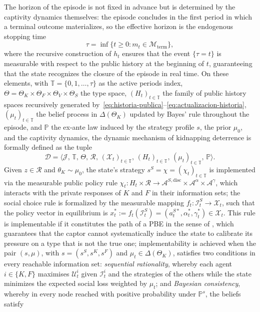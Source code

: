 \documentclass[ecta,nameyear,draft]{econsocart}
\theoremstyle{plain}
\theoremstyle{definition}
\newcommand{\Prob}{\mathbb{P}}
\newcommand{\ThetaK}{\Theta_K}
\newcommand{\1}{\mathbf{1}}
\begin{document}
The horizon of the episode is not fixed in advance but is determined by the captivity dynamics themselves: the episode concludes in the first period in which a terminal outcome materializes, so the effective horizon is the endogenous stopping time
\begin{equation}
\tau=\inf\{t\geq 0:m_t\in\mathcal{M}_{\mathrm{term}}\},\label{eq:stopping-time}
\end{equation}
where the recursive construction of $h_t$ ensures that the event $\{\tau=t\}$ is measurable with respect to the public history at the beginning of $t$, guaranteeing that the state recognizes the closure of the episode in real time. On these elements, with $\mathbb{T}=\{0,1,\ldots,\tau\}$ as the active periods index, $\Theta=\ThetaK\times\Theta_F\times\Theta_V\times\Theta_S$ the type space, $(H_t)_{t\in\mathbb{T}}$ the family of public history spaces recursively generated by~\eqref{eq:historia-publica}--\eqref{eq:actualizacion-historia}, $(\mu_t)_{t\in\mathbb{T}}$ the belief process in $\Delta(\ThetaK)$ updated by Bayes' rule throughout the episode, and $\Prob$ the ex-ante law induced by the strategy profile $s$, the prior $\mu_0$, and the captivity dynamics, the dynamic mechanism of kidnapping deterrence is formally defined as the tuple
\[
\mathcal{D}=\bigl\langle\mathcal{J},\,\mathbb{T},\,\Theta,\,\mathcal{R},\,(\mathcal{X}_t)_{t\in\mathbb{T}},\,(H_t)_{t\in\mathbb{T}},\,(\mu_t)_{t\in\mathbb{T}},\,\Prob\bigr\rangle.
\]
Given $z\in\mathcal{R}$ and $\theta_K\sim\mu_0$, the state's strategy $s^S=\chi=(\chi_t)_{t\in\mathbb{T}}$ is implemented via the measurable public policy rule $\chi_t\colon H_t\times\mathcal{R}\to\mathcal{A}^{S,\mathrm{disc}}\times\mathcal{A}^{\alpha}\times\mathcal{A}^{\gamma}$, which interacts with the private responses of $K$ and $F$ in their information sets; the social choice rule is formalized by the measurable mapping $f_t\colon\mathcal{I}_t^S\to\mathcal{X}_t$, such that the policy vector in equilibrium is $x_t^\ast:=f_t(\mathcal{I}_t^S)=(a_t^{S\ast},\alpha_t^\ast,\gamma_t^\ast)\in\mathcal{X}_t$. This rule is implementable if it constitutes the path of a PBE in the sense of \citet{FudenbergTirole1991}, which guarantees that the captor cannot systematically induce the state to calibrate its pressure on a type that is not the true one; implementability is achieved when the pair $(s,\mu)$, with $s=(s^S,s^K,s^F)$ and $\mu_t\in\Delta(\ThetaK)$, satisfies two conditions in every reachable information set: \emph{sequential rationality}, whereby each agent $i\in\{K,F\}$ maximises $\mathcal{U}_t^i$ given $\mathcal{I}_t^i$ and the strategies of the others while the state minimizes the expected social loss weighted by $\mu_t$; and \emph{Bayesian consistency}, whereby in every node reached with positive probability under $\Prob^s$, the beliefs satisfy
\end{document}
